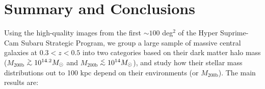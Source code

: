 \documentclass[a4paper,fleqn,usenatbib]{mnras}
\def\simlt{\lower.5ex\hbox{$\; \buildrel < \over {\sim} \;$}}
\def\simgt{\lower.5ex\hbox{$\; \buildrel > \over {\sim} \;$}}
\def\mhalo{{$M_{\mathrm{200b}}$}}
\begin{document}

\section{Summary and Conclusions}
    \label{sec:summary}
    
    Using the high-quality images from the first $\sim100$ deg$^2$ of the 
    Hyper Suprime-Cam Subaru Strategic Program, we group a large sample of massive 
    central galaxies at $0.3 < z < 0.5$ into two categories based on their dark matter
    halo mass (\mhalo{}$\simgt 10^{14.2} M_{\odot}$ and 
    \mhalo{}$\simlt 10^{14} M_{\odot}$), and study how their stellar mass distributions 
    out to 100 kpc depend on their environments (or \mhalo{}). 
    The main results are:  
    
\end{document}
